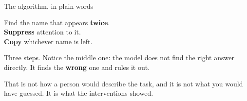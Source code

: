 \documentclass[aspectratio=169]{beamer}
\newcommand{\takebox}[1]{%
  \begin{tcolorbox}[colback=paramgreen!8, colframe=paramgreen, boxrule=0.6pt, arc=2pt]
  #1
  \end{tcolorbox}}
\begin{document}
\begin{frame}{The algorithm, in plain words}
  \vspace{1.0em}
  \begin{center}
  \begin{tcolorbox}[colback=armblue!8, colframe=armblue, boxrule=0.8pt, arc=3pt,
                    width=0.86\textwidth]
    \centering\large
    Find the name that appears \textbf{twice}.\\[0.5em]
    \textbf{Suppress} attention to it.\\[0.5em]
    \textbf{Copy} whichever name is left.
  \end{tcolorbox}
  \end{center}

  \vspace{1.1em}
  Three steps. Notice the middle one: the model does not find the right answer directly. It finds
  the \textbf{wrong} one and rules it out.

  \vspace{0.9em}
  \takebox{That is not how a person would describe the task, and it is not what you would have
  guessed. It is what the interventions showed.}
\end{frame}
\end{document}
